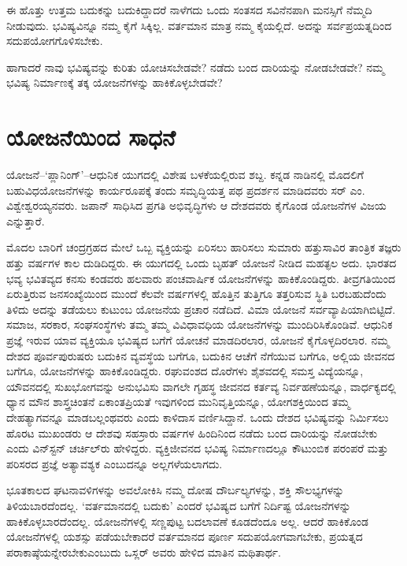 ಈ ಹೊತ್ತು ಉತ್ತಮ ಬದುಕನ್ನು ಬದುಕಿದ್ದಾದರೆ ನಾಳೆಗದು ಒಂದು ಸಂತಸದ ಸವಿನೆನಪಾಗಿ ಮನಸ್ಸಿಗೆ ನೆಮ್ಮದಿ ನೀಡುವುದು. ಭವಿಷ್ಯವಿನ್ನೂ ನಮ್ಮ ಕೈಗೆ ಸಿಕ್ಕಿಲ್ಲ. ವರ್ತಮಾನ ಮಾತ್ರ ನಮ್ಮ ಕೈಯಲ್ಲಿದೆ. ಅದನ್ನು ಸರ್ವಪ್ರಯತ್ನದಿಂದ ಸದುಪಯೋಗಗೊಳಿಸಬೇಕು.

ಹಾಗಾದರೆ ನಾವು ಭವಿಷ್ಯವನ್ನು ಕುರಿತು ಯೋಚಿಸಬೇಡವೇ? ನಡೆದು ಬಂದ ದಾರಿಯನ್ನು ನೋಡಬೇಡವೇ? ನಮ್ಮ ಭವಿಷ್ಯ ನಿರ್ಮಾಣಕ್ಕೆ ತಕ್ಕ ಯೋಜನೆಗಳನ್ನು ಹಾಕಿಕೊಳ್ಳಬೇಡವೇ?


\section*{ಯೋಜನೆಯಿಂದ ಸಾಧನೆ}

\vskip -8pt

ಯೋಜನೆ–‘ಪ್ಲಾನಿಂಗ್​’–ಆಧುನಿಕ ಯುಗದಲ್ಲಿ ವಿಶೇಷ ಬಳಕೆಯಲ್ಲಿರುವ ಶಬ್ದ. ಕನ್ನಡ ನಾಡಿನಲ್ಲಿ ಮೊದಲಿಗೆ ಬಹುವಿಧಯೋಜನೆಗಳನ್ನು ಕಾರ್ಯರೂಪಕ್ಕೆ ತಂದು ಸಮೃದ್ಧಿಯತ್ತ ಪಥ ಪ್ರದರ್ಶನ ಮಾಡಿದವರು ಸರ್ ಎಂ. ವಿಶ್ವೇಶ್ವರಯ್ಯನವರು. ಜಪಾನ್ ಸಾಧಿಸಿದ ಪ್ರಗತಿ ಅಭಿವೃದ್ಧಿಗಳು ಆ ದೇಶದವರು ಕೈಗೊಂಡ ಯೋಜನೆಗಳ ವಿಜಯ ಎನ್ನುತ್ತಾರೆ.

ಮೊದಲ ಬಾರಿಗೆ ಚಂದ್ರಗ್ರಹದ ಮೇಲೆ ಒಬ್ಬ ವ್ಯಕ್ತಿಯನ್ನು ಏರಿಸಲು ಹಾರಿಸಲು ಸುಮಾರು ಹತ್ತುಸಾವಿರ ತಾಂತ್ರಿಕ ತಜ್ಞರು ಹತ್ತು ವರ್ಷಗಳ ಕಾಲ ದುಡಿದಿದ್ದರು. ಈ ಯುಗದಲ್ಲಿ ಒಂದು ಬೃಹತ್ ಯೋಜನೆ ನೀಡಿದ ಮಹತ್ಫಲ ಅದು. ಭಾರತದ ಭವ್ಯ ಭವಿತವ್ಯದ ಕನಸು ಕಂಡವರು ಹಲವಾರು ಪಂಚವಾರ್ಷಿಕ ಯೋಜನೆಗಳನ್ನು ಹಾಕಿಕೊಂಡಿದ್ದರು. ತೀವ್ರಗತಿಯಿಂದ ಏರುತ್ತಿರುವ ಜನಸಂಖ್ಯೆಯಿಂದ ಮುಂದೆ ಕೆಲವೇ ವರ್ಷಗಳಲ್ಲಿ ಹೊತ್ತಿನ ತುತ್ತಿಗೂ ತತ್ತರಿಸುವ ಸ್ಥಿತಿ ಬರಬಹುದೆಂದು ತಿಳಿದು ಅದನ್ನು ತಡೆಯಲು ಕುಟುಂಬ ಯೋಜನೆಯ ಪ್ರಚಾರ ನಡೆದಿದೆ. ವಿಮಾ ಯೋಜನೆ ಸರ್ವವ್ಯಾಪಿಯಾಗಿಬಿಟ್ಟಿದೆ. ಸಮಾಜ, ಸರಕಾರ, ಸಂಘಸಂಸ್ಥೆಗಳು ತಮ್ಮ ತಮ್ಮ ವಿವಿಧಾವಧಿಯ ಯೋಜನೆಗಳನ್ನು ಮುಂದಿರಿಸಿಕೊಂಡಿವೆ. ಆಧುನಿಕ ಪ್ರಜ್ಞೆ ಇರುವ ಯಾವ ವ್ಯಕ್ತಿಯೂ ಭವಿಷ್ಯದ ಬಗೆಗೆ ಯೋಚನೆ ಮಾಡದಿರಲಾರ, ಯೋಜನೆ ಕೈಗೊಳ್ಳದಿರಲಾರ. ನಮ್ಮ ದೇಶದ ಪೂರ್ವಪುರುಷರು ಬದುಕಿನ ವ್ಯವಸ್ಥೆಯ ಬಗೆಗೂ, ಬದುಕಿನ ಆಚೆಗೆ ನೆಗೆಯುವ ಬಗೆಗೂ, ಅಲ್ಲಿಯ ಜೀವನದ ಬಗೆಗೂ, ಯೋಜನೆಗಳನ್ನು ಹಾಕಿಕೊಂಡಿದ್ದರು. ರಘುವಂಶದ ದೊರೆಗಳು ಶೈಶವದಲ್ಲಿ ಸಮಸ್ತ ವಿದ್ಯೆಯನ್ನೂ, ಯೌವನದಲ್ಲಿ ಸುಖಭೋಗವನ್ನು ಅನುಭವಿಸು ವಾಗಲೇ ಗೃಹಸ್ಥ ಜೀವನದ ಕರ್ತವ್ಯ ನಿರ್ವಹಣೆಯನ್ನೂ, ವಾರ್ಧಕ್ಯದಲ್ಲಿ ಧ್ಯಾನ ಮೌನ ಶಾಸ್ತ್ರಚಿಂತನೆ ಏಕಾಂತಪ್ರಿಯತೆ ಇವುಗಳಿಂದ ಮುನಿವೃತ್ತಿಯನ್ನೂ, ಯೋಗಶಕ್ತಿಯಿಂದ ತಮ್ಮ ದೇಹತ್ಯಾಗವನ್ನೂ ಮಾಡಬಲ್ಲಂಥವರು ಎಂದು ಕಾಳಿದಾಸ ವರ್ಣಿಸಿದ್ದಾನೆ. ಒಂದು ದೇಶದ ಭವಿಷ್ಯವನ್ನು ನಿರ್ಮಿಸಲು ಹೊರಟ ಮುಖಂಡರು ಆ ದೇಶವು ಸಹಸ್ರಾರು ವರ್ಷಗಳ ಹಿಂದಿನಿಂದ ನಡೆದು ಬಂದ ದಾರಿಯನ್ನು ನೋಡಬೇಕು ಎಂದು ವಿನ್​ಸ್ಟನ್ ಚರ್ಚಿಲ್​ರು ಹೇಳಿದ್ದರು. ವ್ಯಕ್ತಿಜೀವನದ ಭವಿಷ್ಯ ನಿರ್ಮಾಣದಲ್ಲೂ ಕೌಟುಂಬಿಕ ಪರಂಪರೆ ಮತ್ತು ಪರಿಸರದ ಪ್ರಜ್ಞೆ ಅತ್ಯಾವಶ್ಯಕ ಎಂಬುದನ್ನೂ ಅಲ್ಲಗಳೆಯಲಾಗದು.

ಭೂತಕಾಲದ ಘಟನಾವಳಿಗಳನ್ನು ಅವಲೋಕಿಸಿ ನಮ್ಮ ದೋಷ ದೌರ್ಬಲ್ಯಗಳನ್ನು, ಶಕ್ತಿ ಸೌಲಭ್ಯಗಳನ್ನು ತಿಳಿಯಬಾರದೆಂದಲ್ಲ. ‘ವರ್ತಮಾನದಲ್ಲಿ ಬದುಕು’ ಎಂದರೆ ಭವಿಷ್ಯದ ಬಗೆಗೆ ನಿರ್ದಿಷ್ಟ ಯೋಜನೆಗಳನ್ನು ಹಾಕಿಕೊಳ್ಳಬಾರದೆಂದಲ್ಲ. ಯೋಜನೆಗಳಲ್ಲಿ ಸಣ್ಣಪುಟ್ಟ ಬದಲಾವಣೆ ಕೂಡದೆಂದೂ ಅಲ್ಲ. ಆದರೆ ಹಾಕಿಕೊಂಡ ಯೋಜನೆಗಳಲ್ಲಿ ಯಶಸ್ಸು ಪಡೆಯಬೇಕಾದರೆ ವರ್ತಮಾನದ ಪೂರ್ಣ ಸದುಪಯೋಗವಾಗಬೇಕು, ಪ್ರಯತ್ನದ ಪರಾಕಾಷ್ಠೆಯನ್ನೇರಬೇಕು\break ಎಂಬುದು ಒಸ್ಲರ್ ಅವರು ಹೇಳಿದ ಮಾತಿನ ಮಥಿತಾರ್ಥ.

